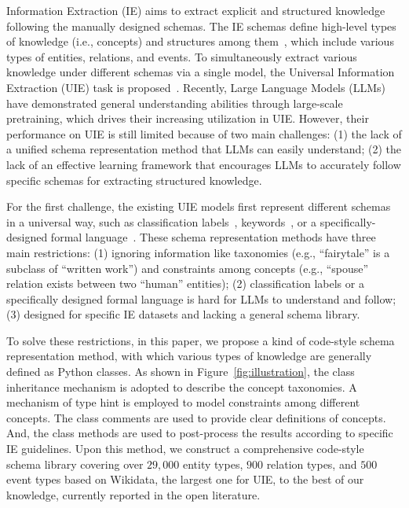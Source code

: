 Information Extraction (IE) aims to extract explicit and structured knowledge
following the manually designed schemas. The IE schemas define high-level types
of knowledge (i.e., concepts) and structures among them~\cite{kg-book}, which
include various types of entities, relations, and events. To simultaneously
extract various knowledge under different schemas via a single model, the
Universal Information Extraction (UIE) task is proposed~\cite{lin2020joint}.
Recently, Large Language Models (LLMs) have demonstrated general understanding
abilities through large-scale pretraining, which drives their increasing
utilization in UIE. However, their performance on UIE is still limited because
of two main challenges: (1) the lack of a unified schema representation method
that LLMs can easily understand; (2) the lack of an effective learning framework
that encourages LLMs to accurately follow specific schemas for extracting
structured knowledge.

For the first challenge, the existing UIE models first represent different
schemas in a universal way, such as classification labels~\cite{lin2020joint},
keywords~\cite{gui2023instructie}, or a specifically-designed formal
language~\cite{lu-etal-2022-unified}. These schema representation methods have
three main restrictions: (1) ignoring information like taxonomies (e.g.,
``fairytale'' is a subclass of ``written work'') and constraints among concepts
(e.g., ``spouse'' relation exists between two ``human'' entities); (2)
classification labels or a specifically designed formal language is hard for
LLMs to understand and follow; (3) designed for specific IE datasets and lacking
a general schema library.

To solve these restrictions, in this paper, we propose a kind of code-style
schema representation method, with which various types of knowledge are
generally defined as Python classes. As shown in Figure~\ref{fig:illustration},
the class inheritance mechanism is adopted to describe the concept taxonomies. A
mechanism of type hint is employed to model constraints among different
concepts. The class comments are used to provide clear definitions of concepts.
And, the class methods are used to post-process the results according to
specific IE guidelines. Upon this method, we construct a comprehensive
code-style schema library covering over $29,000$ entity types, $900$ relation types,
and $500$ event types based on Wikidata, the largest one for UIE, to the best of
our knowledge, currently reported in the open literature.

